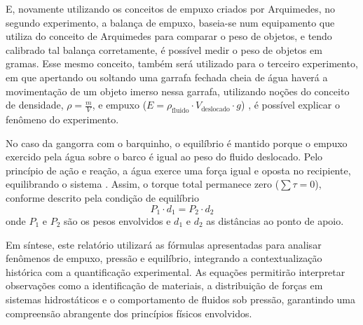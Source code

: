 E, novamente utilizando os conceitos de empuxo criados por Arquimedes, no
segundo experimento, a balança de empuxo, baseia-se num equipamento que utiliza
do conceito de Arquimedes para comparar o peso de objetos, e tendo calibrado tal
balança corretamente, é possível medir o peso de objetos em gramas. Esse mesmo
conceito, também será utilizado para o terceiro experimento, em que apertando ou
soltando uma garrafa fechada cheia de água haverá a movimentação de um objeto
imerso nessa garrafa, utilizando noções do conceito de densidade, $\rho =
\frac{m}{V}$, e empuxo ($E = \rho_{\text{fluido}} \cdot V_{\text{deslocado}}
\cdot g$) \cite{nussenzveig2014}, é possível explicar o fenômeno do
experimento.

No caso da gangorra com o barquinho, o equilíbrio é mantido porque o empuxo
exercido pela água sobre o barco é igual ao peso do fluido deslocado. Pelo
princípio de ação e reação, a água exerce uma força igual e oposta no
recipiente, equilibrando o sistema \cite{nussenzveig2014}. Assim, o torque total
permanece zero ($\sum \tau = 0$), conforme descrito pela condição de equilíbrio
\begin{equation}
	P_1 \cdot d_1 = P_2 \cdot d_2 \label{eq:equilibrio}
\end{equation}
onde $P_1$ e $P_2$ são os pesos envolvidos e $d_1$ e $d_2$ as distâncias ao
ponto de apoio.

Em síntese, este relatório utilizará as fórmulas apresentadas para analisar
fenômenos de empuxo, pressão e equilíbrio, integrando a contextualização
histórica com a quantificação experimental. As equações permitirão interpretar
observações como a identificação de materiais, a distribuição de forças em
sistemas hidrostáticos e o comportamento de fluidos sob pressão, garantindo uma
compreensão abrangente dos princípios físicos envolvidos.


